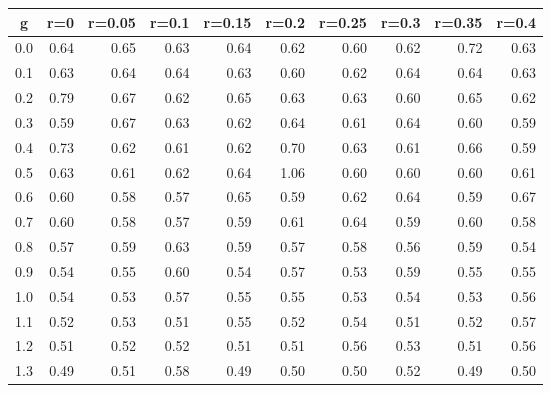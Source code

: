 %
\begin{table}[!tbp]
 \begin{center}
 \begin{tabular}{rrrrrrrrrr}\hline\hline
\multicolumn{1}{c}{g}&\multicolumn{1}{c}{r=0}&\multicolumn{1}{c}{r=0.05}&\multicolumn{1}{c}{r=0.1}&\multicolumn{1}{c}{r=0.15}&\multicolumn{1}{c}{r=0.2}&\multicolumn{1}{c}{r=0.25}&\multicolumn{1}{c}{r=0.3}&\multicolumn{1}{c}{r=0.35}&\multicolumn{1}{c}{r=0.4}\tabularnewline
\hline
0.0&0.64&0.65&0.63&0.64&0.62&0.60&0.62&0.72&0.63\tabularnewline
0.1&0.63&0.64&0.64&0.63&0.60&0.62&0.64&0.64&0.63\tabularnewline
0.2&0.79&0.67&0.62&0.65&0.63&0.63&0.60&0.65&0.62\tabularnewline
0.3&0.59&0.67&0.63&0.62&0.64&0.61&0.64&0.60&0.59\tabularnewline
0.4&0.73&0.62&0.61&0.62&0.70&0.63&0.61&0.66&0.59\tabularnewline
0.5&0.63&0.61&0.62&0.64&1.06&0.60&0.60&0.60&0.61\tabularnewline
0.6&0.60&0.58&0.57&0.65&0.59&0.62&0.64&0.59&0.67\tabularnewline
0.7&0.60&0.58&0.57&0.59&0.61&0.64&0.59&0.60&0.58\tabularnewline
0.8&0.57&0.59&0.63&0.59&0.57&0.58&0.56&0.59&0.54\tabularnewline
0.9&0.54&0.55&0.60&0.54&0.57&0.53&0.59&0.55&0.55\tabularnewline
1.0&0.54&0.53&0.57&0.55&0.55&0.53&0.54&0.53&0.56\tabularnewline
1.1&0.52&0.53&0.51&0.55&0.52&0.54&0.51&0.52&0.57\tabularnewline
1.2&0.51&0.52&0.52&0.51&0.51&0.56&0.53&0.51&0.56\tabularnewline
1.3&0.49&0.51&0.58&0.49&0.50&0.50&0.52&0.49&0.50\tabularnewline
\hline
\end{tabular}

\end{center}

\end{table}

